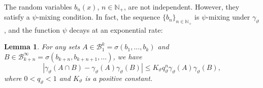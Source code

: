 \documentclass[final,1p,times]{elsarticle}
\newtheorem{lemma}[theorem]{Lemma}
\numberwithin{equation}{section}
\begin{document}
The random variables \( b_n(x) \), \( n \in \mathbb{N}_+ \), are not independent. However, they satisfy a \( \psi \)-mixing condition. In fact, the sequence \( \{b_n\}_{n \in \mathbb{N}_+} \) is \( \psi \)-mixing under \( \gamma_{\vartheta} \), and the function \( \psi \) decays at an exponential rate:

\begin{lemma} \label{lema4.3}
For any sets \( A \in \mathcal{B}_1^k = \sigma(b_1, \ldots, b_k) \) and \( B \in \mathcal{B}_{k+n}^{\infty} = \sigma(b_{k+n}, b_{k+n+1}, \ldots) \), we have
\begin{equation} \label{4.004} 
\left| \gamma_{\vartheta}(A \cap B) - \gamma_{\vartheta}(A) \gamma_{\vartheta}(B) \right| \leq K_{\vartheta} q^n_{\vartheta} \gamma_{\vartheta}(A) \gamma_{\vartheta}(B),
\end{equation}
where \( 0 < q_{\vartheta} < 1 \) and \( K_{\vartheta} \) is a positive constant.
\end{lemma}
\end{document}
